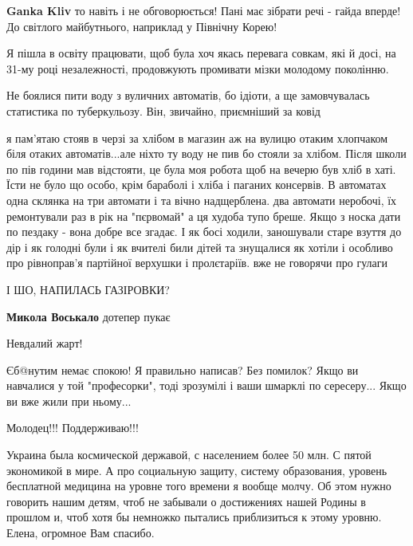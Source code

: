 \begin{itemize}
\begin{itemize}
\textbf{Ganka Kliv} то навіть і не обговорюється! Пані має зібрати речі - гайда вперде! До світлого майбутнього, наприклад у Північну Корею!
\end{itemize} %

Я пішла в освіту працювати, щоб була хоч якась перевага совкам, які й досі, на 31-му році незалежності, продовжують промивати мізки молодому поколінню.

Не боялися пити воду з вуличних автоматів, бо ідіоти, а ще замовчувалась статистика по туберкульозу. Він, звичайно, приємніший за ковід


я пам'ятаю стояв в черзі за хлібом в магазин аж на вулицю отаким хлопчаком біля
отаких автоматів...але ніхто ту воду не пив бо стояли за хлібом. Після школи по
пів години мав відстояти, це була моя робота щоб на вечерю був хліб в хаті.
Їсти не було що особо, крім бараболі і хліба і паганих консервів. В автоматах
одна склянка на три автомати і та вічно надщерблена. два автомати неробочі, їх
ремонтували раз в рік на "пєрвомай" а ця худоба тупо бреше. Якщо з носка дати
по пездаку - вона добре все згадає. І як босі ходили, заношували старе взуття
до дір і як голодні були і як вчителі били дітей та знущалися як хотіли і
особливо про рівноправ'я партійної верхушки і пролєтаріїв. вже не говорячи про
гулаги

І ШО, НАПИЛАСЬ ГАЗІРОВКИ?

\begin{itemize} %
\textbf{Микола Воськало} дотепер пукає
\end{itemize} %

Невдалий жарт!

Єб@нутим немає спокою!
Я правильно написав? Без помилок?
Якщо ви навчалися у той "професорки", тоді зрозумілі і ваши шмарклі по
сересеру... Якщо ви вже жили при ньому...

 
Молодец!!! Поддерживаю!!!

Украина была космической державой, с населением более 50 млн. С пятой
экономикой в мире. А про социальную защиту, систему образования, уровень
бесплатной медицина на уровне того времени я вообще молчу. Об этом нужно
говорить нашим детям, чтоб не забывали о достижениях нашей Родины в прошлом и,
чтоб хотя бы немножко пытались приблизиться к этому уровню. Елена, огромное Вам
спасибо.


\end{itemize}
